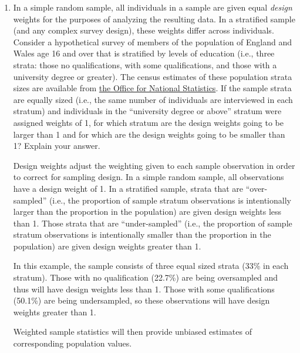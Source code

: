 \documentclass[a4paper]{exam}
\begin{document}
\begin{enumerate}
\begin{solution}
\end{solution}

\item In a simple random sample, all individuals in a sample are given equal \emph{design} weights for the purposes of analyzing the resulting data. In a stratified sample (and any complex survey design), these weights differ across individuals. Consider a hypothetical survey of members of the population of England and Wales age 16 and over that is stratified by levels of education (i.e., three strata: those no qualifications, with some qualifications, and those with a university degree or greater). The census estimates of these population strata sizes are available from \href{http://www.ons.gov.uk/ons/rel/census/2011-census-analysis/local-area-analysis-of-qualifications-across-england-and-wales/info-highest-qualifications.html}{the Office for National Statistics}. If the sample strata are equally sized (i.e., the same number of individuals are interviewed in each stratum) and individuals in the ``university degree or above'' stratum were assigned weights of 1, for which stratum are the design weights going to be larger than 1 and for which are the design weights going to be smaller than 1? Explain your answer.

\begin{solution}

Design weights adjust the weighting given to each sample observation in order to correct for sampling design. In a simple random sample, all observations have a design weight of 1. In a stratified sample, strata that are ``over-sampled'' (i.e., the proportion of sample stratum observations is intentionally larger than the proportion in the population) are given design weights less than 1. Those strata that are ``under-sampled'' (i.e., the proportion of sample stratum observations is intentionally smaller than the proportion in the population) are given design weights greater than 1.

In this example, the sample consists of three equal sized strata (33\% in each stratum). Those with no qualification (22.7\%) are being oversampled and thus will have design weights less than 1. Those with some qualifications (50.1\%) are being undersampled, so these observations will have design weights greater than 1.

Weighted sample statistics will then provide unbiased estimates of corresponding population values.

\end{solution}


\end{enumerate}
\end{document}
